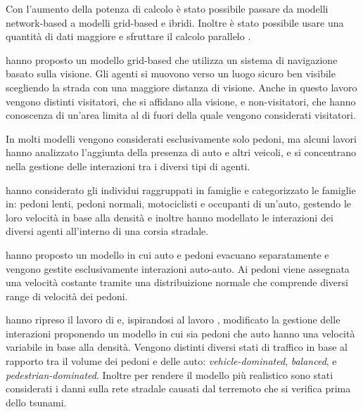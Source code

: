 Con l'aumento della potenza di calcolo è stato possibile passare da modelli network-based a modelli grid-based e ibridi.
Inoltre è stato possibile usare una quantità di dati maggiore e sfruttare il calcolo parallelo \parencite{wijerathne2013hpc, makinoshima2018enhancing}.

\textcite{wijerathne2013hpc} hanno proposto un modello grid-based che utilizza un sistema di navigazione basato
sulla visione. Gli agenti si muovono verso un luogo sicuro ben visibile scegliendo la strada con una maggiore distanza di visione.
%
Anche in questo lavoro vengono distinti visitatori, che si affidano alla visione, e non-visitatori, che hanno conoscenza di un'area
limita al di fuori della quale vengono considerati visitatori.




In molti modelli vengono considerati esclusivamente solo pedoni, ma alcuni lavori hanno analizzato l'aggiunta della presenza di auto e altri veicoli,
e si concentrano nella gestione delle interazioni tra i diversi tipi di agenti.

\textcite{goto2012tsunami} hanno considerato gli individui raggruppati in famiglie e categorizzato le famiglie in:
pedoni lenti, pedoni normali, motociclisti e occupanti di un'auto, gestendo le loro velocità in base alla densità e inoltre hanno
modellato le interazioni dei diversi agenti all'interno di una corsia stradale.

\textcite{wang2016agent} hanno proposto un modello in cui auto e pedoni evacuano separatamente e vengono gestite esclusivamente interazioni auto-auto. Ai pedoni viene assegnata
una velocità costante tramite una distribuizione normale che comprende diversi range di velocità dei pedoni.

\textcite{wang2021novel} hanno ripreso il lavoro di \textcite{wang2016agent} e, 
ispirandosi al lavoro \textcite{goto2012tsunami}, modificato la gestione delle interazioni proponendo un modello in cui sia pedoni che auto hanno una velocità variabile in base alla densità.
Vengono distinti diversi stati di traffico in base al rapporto tra il volume dei pedoni e delle auto: \textit{vehicle-dominated}, \textit{balanced}, e \textit{pedestrian-dominated}. 
Inoltre per rendere il modello più realistico sono stati considerati i danni sulla rete stradale causati dal terremoto che si verifica prima dello tsunami.
